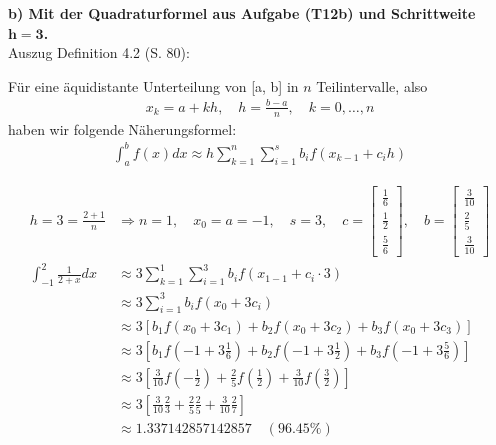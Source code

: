 \documentclass[10pt,a4paper]{article}
\begin{document}
        \textbf{%
        b) Mit der Quadraturformel aus Aufgabe (T12b) und Schrittweite $\pmb{h=3}$.
        }\\
	    Auszug Definition 4.2 (S. 80):
	    \begin{mdframed}[linewidth=0pt,backgroundcolor=gray!20]
	    Für eine äquidistante Unterteilung von [a, b] in $n$ Teilintervalle, also
	    \begin{align}\tag{4.22}
		    x_k = a + k h,\quad h = \frac{b-a}{n} ,\quad k=0,\dots,n
	    \end{align}
	    haben wir folgende Näherungsformel:
		\begin{align}\tag{4.23}
			\int_{a}^{b}f(x)dx \approx h\sum_{k=1}^{n}\sum_{i=1}^{s}b_if(x_{k-1}+c_ih)
		\end{align}
	\end{mdframed}
	    \begin{align*}
		    h=3=\frac{2+1}{n} &\Rightarrow n=1, \quad x_0=a=-1 ,\quad s=3, \quad
		    c = \begin{bmatrix}
			    \frac{1}{6} \\
			    \frac{1}{2} \\
			    \frac{5}{6}
		    \end{bmatrix}, \quad  b= \begin{bmatrix}
		    	\frac{3}{10} \\
		    	\frac{2}{5}  \\
		    	\frac{3}{10}
		    \end{bmatrix} \\
		\int_{-1}^{2}\frac{1}{2+x}dx &\approx 3\sum_{k=1}^{1}\sum_{i=1}^{3}b_if(x_{1-1}+c_i\cdot3) \\
	    &\approx 3\sum_{i=1}^{3}b_if(x_{0}+3c_i) \\
	    &\approx 3\left[b_1f(x_{0}+3c_1)+b_2f(x_{0}+3c_2)+b_3f(x_{0}+3c_3) \right] \\
	    &\approx 3\left[b_1f(-1+3\frac{1}{6})+b_2f(-1+3\frac{1}{2})+b_3f(-1+3\frac{5}{6})\right]  \\
	    &\approx 3\left[\frac{3}{10}f(-\frac{1}{2})+\frac{2}{5}f(\frac{1}{2})+\frac{3}{10}f(\frac{3}{2})\right]  \\
	    &\approx 3\left[\frac{3}{10}\frac{2}{3}+\frac{2}{5}\frac{2}{5}+\frac{3}{10}\frac{2}{7}\right]  \\
	    &\approx 1.337142857142857 \quad (96.45\%)
	    \end{align*}
	    
\end{document}
